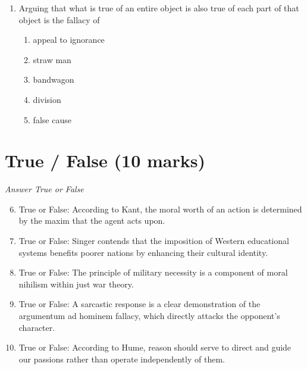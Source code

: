 \documentclass[12pt]{article}
\begin{document}
\begin{enumerate}[label=\arabic*.]
\begin{enumerate}[label=(\alph*)]
    \item very inefficiently, and are therefore not worth donating to.
    \item with a high level of bureaucracy and corruption, therefore not recommended.
    \item more effectively than we could get it to our close neighbors.
    \item extremely efficiently, making them the only viable option for aid distribution.
\end{enumerate}
\item Arguing that what is true of an entire object is also true of each part of that object is the fallacy of
\begin{enumerate}[label=(\alph*)]
    \item appeal to ignorance
    \item straw man
    \item bandwagon
    \item division
    \item false cause
\end{enumerate}
\end{enumerate}

\section*{True / False (10 marks)}
\textit{Answer True or False}
\begin{enumerate}[label=\arabic*.]
\setcounter{enumi}{5}
\item True or False: According to Kant, the moral worth of an action is determined by the maxim that the agent acts upon.
\item True or False: Singer contends that the imposition of Western educational systems benefits poorer nations by enhancing their cultural identity.
\item True or False: The principle of military necessity is a component of moral nihilism within just war theory.
\item True or False: A sarcastic response is a clear demonstration of the argumentum ad hominem fallacy, which directly attacks the opponent's character.
\item True or False: According to Hume, reason should serve to direct and guide our passions rather than operate independently of them.
\end{enumerate}
\end{document}
